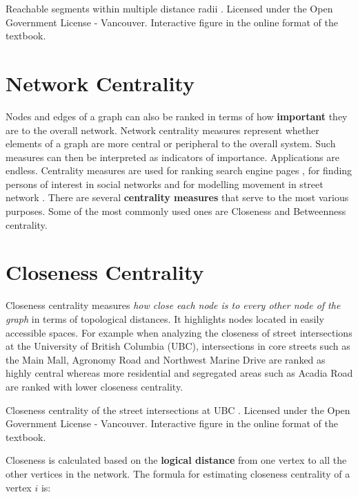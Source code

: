 \documentclass[
]{book}
\begin{document}
\label{fig:8-reach-analysis}Reachable segments within multiple distance radii \citep{city_of_vancouver_open_nodate}. Licensed under the Open Government License - Vancouver. Interactive figure in the online format of the textbook.

\section{Network Centrality}\label{network-centrality}

Nodes and edges of a graph can also be ranked in terms of how \textbf{important} they are to the overall network. Network centrality measures represent whether elements of a graph are more central or peripheral to the overall system. Such measures can then be interpreted as indicators of importance. Applications are endless. Centrality measures are used for ranking search engine pages \citep{wikimedia_pagerank_2021}, for finding persons of interest in social networks \citep{ajorlou_introduction_2018} and for modelling movement in street network \citep{hillier_natural_1993}. There are several \textbf{centrality measures} that serve to the most various purposes. Some of the most commonly used ones are Closeness and Betweenness centrality.

\section{Closeness Centrality}\label{closeness-centrality}

Closeness centrality measures \emph{how close each node is to every other node of the graph} in terms of topological distances. It highlights nodes located in easily accessible spaces. For example when analyzing the closeness of street intersections at the University of British Columbia (UBC), intersections in core streets such as the Main Mall, Agronomy Road and Northwest Marine Drive are ranked as highly central whereas more residential and segregated areas such as Acadia Road are ranked with lower closeness centrality.

\label{fig:8-closeness-centrality-UBC}Closeness centrality of the street intersections at UBC \citep{city_of_vancouver_open_nodate}. Licensed under the Open Government License - Vancouver. Interactive figure in the online format of the textbook.

Closeness is calculated based on the \textbf{logical distance} from one vertex to all the other vertices in the network. The formula for estimating closeness centrality of a vertex \(i\) is:
\end{document}
